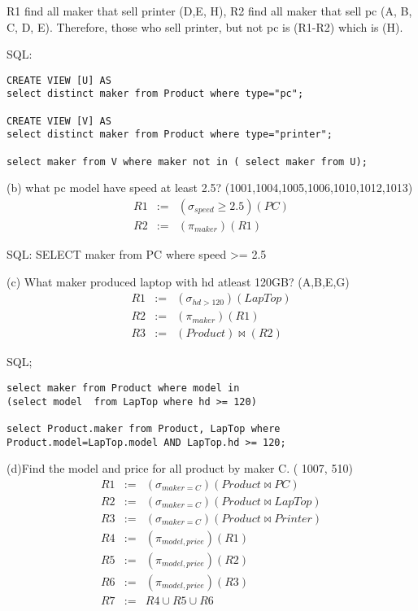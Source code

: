 \documentclass{article}
\begin{document}
R1 find all maker that sell printer (D,E, H), R2 find all maker that sell pc (A, B, C, D, E). Therefore, those who sell printer, but not pc is (R1-R2) which is (H).
 
SQL: 
\begin{verbatim}
CREATE VIEW [U] AS 
select distinct maker from Product where type="pc";

CREATE VIEW [V] AS 
select distinct maker from Product where type="printer";

select maker from V where maker not in ( select maker from U);
\end{verbatim}

(b) what pc model have speed at least 2.5? (1001,1004,1005,1006,1010,1012,1013)
\begin{eqnarray}
R1 &:=& (\sigma_{speed} \geq 2.5 )(PC) \\
R2 &:=& (\pi_{maker})(R1)
\end{eqnarray}

SQL: SELECT maker from PC where speed >= 2.5

(c) What maker produced laptop with hd atleast 120GB? (A,B,E,G)
\begin{eqnarray}
R1 &:=& (\sigma_{hd>120})(LapTop) \\
R2 &:=& (\pi_{maker})(R1) \\
R3 &:=& (Product)\Join(R2)
\end{eqnarray}

SQL;
\begin{verbatim}
select maker from Product where model in 
(select model  from LapTop where hd >= 120)

select Product.maker from Product, LapTop where 
Product.model=LapTop.model AND LapTop.hd >= 120;
\end{verbatim}

(d)Find the model and price for all product by maker C. (
1007, 510)
\begin{eqnarray}
R1 &:=&  (\sigma_{maker=C})(Product \Join PC)\\
R2 &:=&  (\sigma_{maker=C})(Product \Join LapTop)\\
R3 &:=&  (\sigma_{maker=C})(Product \Join Printer)\\
R4 &:=&  (\pi_{model,price})(R1) \\
R5 &:=&  (\pi_{model,price})(R2) \\
R6 &:=&  (\pi_{model,price})(R3) \\
R7 &:=& R4 \cup R5 \cup R6 
\end{eqnarray}
\end{document}
